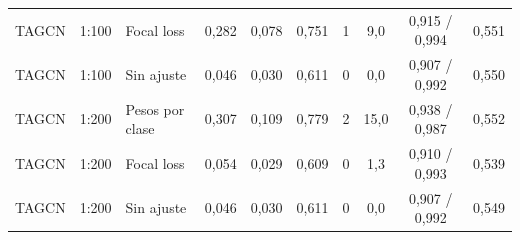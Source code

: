 \begin{longtable}{lllccccccc}
TAGCN & 1:100 & Focal loss & 0{,}282 & 0{,}078 & 0{,}751 & 1 & 9{,}0 & 0{,}915 / 0{,}994 & 0{,}551 \\
TAGCN & 1:100 & Sin ajuste & 0{,}046 & 0{,}030 & 0{,}611 & 0 & 0{,}0 & 0{,}907 / 0{,}992 & 0{,}550 \\
TAGCN & 1:200 & Pesos por clase & 0{,}307 & 0{,}109 & 0{,}779 & 2 & 15{,}0 & 0{,}938 / 0{,}987 & 0{,}552 \\
TAGCN & 1:200 & Focal loss & 0{,}054 & 0{,}029 & 0{,}609 & 0 & 1{,}3 & 0{,}910 / 0{,}993 & 0{,}539 \\
TAGCN & 1:200 & Sin ajuste & 0{,}046 & 0{,}030 & 0{,}611 & 0 & 0{,}0 & 0{,}907 / 0{,}992 & 0{,}549 \\
\bottomrule
\end{longtable}
